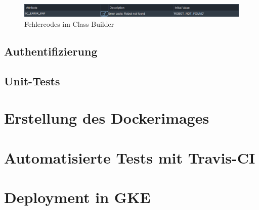 \begin{figure}[ht]
	\centering
	\includegraphics[width=\textwidth]{Bilder/ABAP/2020-12-04 10_22_23-Class Builder_ Display Class ZCL_ZEWM_ROBCO_DPC_EXT_cut.png}
	\caption{Fehlercodes im Class Builder}
	\label{fig:class-builder}
\end{figure}


\subsection{Authentifizierung}

\subsection{Unit-Tests}


\section{Erstellung des Dockerimages}


\section{Automatisierte Tests mit Travis-CI}


\section{Deployment in \ac{GKE}}